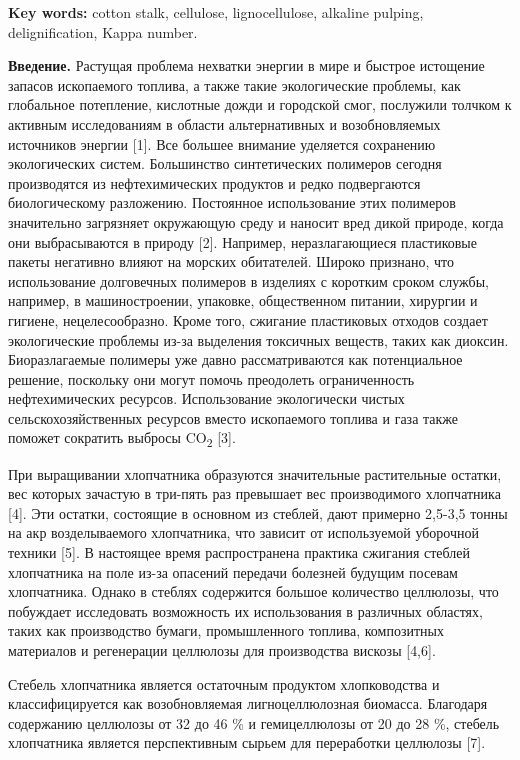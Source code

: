 {\bfseries Key words:} cotton stalk, cellulose, lignocellulose, alkaline
pulping, delignification, Kappa number.

{\bfseries Введение.} Растущая проблема нехватки энергии в мире и быстрое
истощение запасов ископаемого топлива, а также такие экологические
проблемы, как глобальное потепление, кислотные дожди и городской смог,
послужили толчком к активным исследованиям в области альтернативных и
возобновляемых источников энергии {[}1{]}. Все большее внимание
уделяется сохранению экологических систем. Большинство синтетических
полимеров сегодня производятся из нефтехимических продуктов и редко
подвергаются биологическому разложению. Постоянное использование этих
полимеров значительно загрязняет окружающую среду и наносит вред дикой
природе, когда они выбрасываются в природу {[}2{]}. Например,
неразлагающиеся пластиковые пакеты негативно влияют на морских
обитателей. Широко признано, что использование долговечных полимеров в
изделиях с коротким сроком службы, например, в машиностроении, упаковке,
общественном питании, хирургии и гигиене, нецелесообразно. Кроме того,
сжигание пластиковых отходов создает экологические проблемы из-за
выделения токсичных веществ, таких как диоксин. Биоразлагаемые полимеры
уже давно рассматриваются как потенциальное решение, поскольку они могут
помочь преодолеть ограниченность нефтехимических ресурсов. Использование
экологически чистых сельскохозяйственных ресурсов вместо ископаемого
топлива и газа также поможет сократить выбросы CO\textsubscript{2}
{[}3{]}.

При выращивании хлопчатника образуются значительные растительные
остатки, вес которых зачастую в три-пять раз превышает вес производимого
хлопчатника {[}4{]}. Эти остатки, состоящие в основном из стеблей, дают
примерно 2,5-3,5 тонны на акр возделываемого хлопчатника, что зависит от
используемой уборочной техники {[}5{]}. В настоящее время распространена
практика сжигания стеблей хлопчатника на поле из-за опасений передачи
болезней будущим посевам хлопчатника. Однако в стеблях содержится
большое количество целлюлозы, что побуждает исследовать возможность их
использования в различных областях, таких как производство бумаги,
промышленного топлива, композитных материалов и регенерации целлюлозы
для производства вискозы {[}4,6{]}.

Стебель хлопчатника является остаточным продуктом хлопководства и
классифицируется как возобновляемая лигноцеллюлозная биомасса. Благодаря
содержанию целлюлозы от 32 до 46 \% и гемицеллюлозы от 20 до 28 \%,
стебель хлопчатника является перспективным сырьем для переработки
целлюлозы {[}7{]}.


